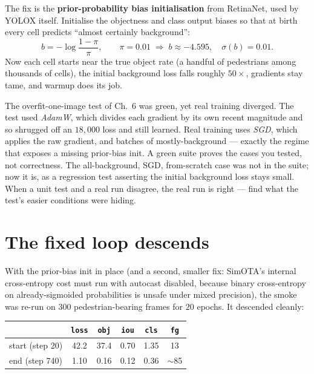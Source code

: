 \documentclass[../main.tex]{subfiles}
\begin{document}
The fix is the \textbf{prior-probability bias initialisation} from RetinaNet, used by YOLOX itself.
Initialise the objectness and class output biases so that at birth every cell predicts ``almost
certainly background'':
\[
  b = -\log\frac{1-\pi}{\pi},\qquad \pi = 0.01 \;\Rightarrow\; b \approx -4.595,\quad \sigma(b)=0.01.
\]
Now each cell starts near the true object rate (a handful of pedestrians among thousands of cells),
the initial background loss falls roughly $50\times$, gradients stay tame, and warmup does its job.

\begin{lesson}
The overfit-one-image test of Ch.~6 was green, yet real training diverged. The test used
\emph{AdamW}, which divides each gradient by its own recent magnitude and so shrugged off an
$18{,}000$ loss and still learned. Real training uses \emph{SGD}, which applies the raw gradient,
and batches of mostly-background --- exactly the regime that exposes a missing prior-bias init. A
green suite proves the cases you tested, not correctness. The all-background, SGD, from-scratch case
was not in the suite; now it is, as a regression test asserting the initial background loss stays
small. When a unit test and a real run disagree, the real run is right --- find what the test's
easier conditions were hiding.
\end{lesson}

\section{The fixed loop descends}

With the prior-bias init in place (and a second, smaller fix: SimOTA's internal cross-entropy cost
must run with autocast disabled, because binary cross-entropy on already-sigmoided probabilities is
unsafe under mixed precision), the smoke was re-run on $300$ pedestrian-bearing frames for $20$
epochs. It descended cleanly:

\begin{center}
\begin{tabular}{lccccc}
\toprule
 & \texttt{loss} & \texttt{obj} & \texttt{iou} & \texttt{cls} & \texttt{fg} \\
\midrule
start (step 20)  & 42.2 & 37.4 & 0.70 & 1.35 & 13 \\
end (step 740)   & 1.10 & 0.16 & 0.12 & 0.36 & $\sim$85 \\
\bottomrule
\end{tabular}
\end{center}
\end{document}
